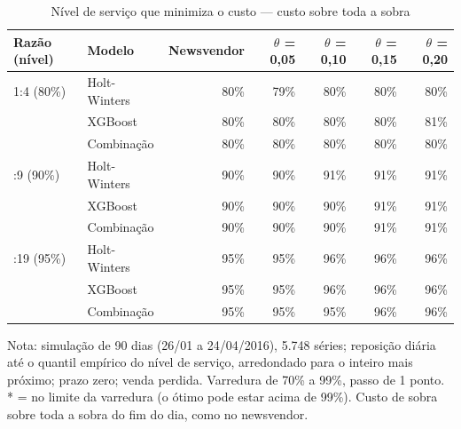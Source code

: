 \begin{table}[htbp]
\centering
\small
\caption{Nível de serviço que minimiza o custo — custo sobre toda a sobra}
\label{tab:sim_nivel_otimo_toda_sobra}
\begin{tabular}{llrrrrr}
\toprule
Razão (nível) & Modelo & Newsvendor & $\theta$ = 0,05 & $\theta$ = 0,10 & $\theta$ = 0,15 & $\theta$ = 0,20 \\
\midrule
1:4 (80\%) & Holt-Winters & 80\% & 79\% & 80\% & 80\% & 80\% \\
 & XGBoost & 80\% & 80\% & 80\% & 80\% & 81\% \\
 & Combinação & 80\% & 80\% & 80\% & 80\% & 80\% \\
\addlinespace
1:9 (90\%) & Holt-Winters & 90\% & 90\% & 91\% & 91\% & 91\% \\
 & XGBoost & 90\% & 90\% & 90\% & 91\% & 91\% \\
 & Combinação & 90\% & 90\% & 90\% & 91\% & 91\% \\
\addlinespace
1:19 (95\%) & Holt-Winters & 95\% & 95\% & 96\% & 96\% & 96\% \\
 & XGBoost & 95\% & 95\% & 96\% & 96\% & 96\% \\
 & Combinação & 95\% & 95\% & 95\% & 96\% & 96\% \\
\bottomrule
\end{tabular}
\par\smallskip
{\footnotesize Nota: simulação de 90 dias (26/01 a 24/04/2016), 5.748 séries; reposição diária até o quantil empírico do nível de serviço, arredondado para o inteiro mais próximo; prazo zero; venda perdida. Varredura de 70\% a 99\%, passo de 1 ponto. * = no limite da varredura (o ótimo pode estar acima de 99\%). Custo de sobra sobre toda a sobra do fim do dia, como no newsvendor. }
\end{table}
